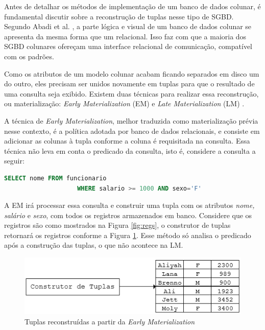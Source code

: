 Antes de detalhar os métodos de implementação de um banco de dados colunar, é fundamental discutir sobre a reconstrução de tuplas nesse tipo de SGBD. 
Segundo Abadi et al. \cite{abadi2007materialization}, a parte lógica e visual de um banco de dados colunar se apresenta da mesma forma que 
um relacional. Isso faz com que a maioria dos SGBD colunares ofereçam uma interface relacional de comunicação, compatível com os padrões.

Como os atributos de um modelo colunar acabam ficando separados em disco um do outro, eles precisam ser unidos novamente em tuplas para 
que o resultado de uma consulta seja exibido. Existem duas técnicas para realizar essa reconstrução, ou materialização: \textit{Early Materialization} (EM) e 
\textit{Late Materialization} (LM) \cite{abadi2007materialization, abadi2008query}.

A técnica de \textit{Early Materialization}, melhor traduzida como materialização prévia nesse contexto, é a política adotada por banco de dados relacionais, e consiste 
em adicionar as colunas à tupla conforme a coluna é requisitada na consulta. Essa técnica não leva em conta o predicado da consulta, isto é, considere 
a consulta a seguir:

\begin{lstlisting}[language=SQL,label=sql_1]
                    SELECT nome FROM funcionario 
                    WHERE salario >= 1000 AND sexo='F'
\end{lstlisting}

A EM irá processar essa consulta e construir uma tupla com os atributos \textit{nome, salário} e \textit{sexo}, com todos os registros 
armazenados em banco. Considere que os registros são como mostrados na Figura \ref{fig:regs}, o construtor de tuplas retornará os registros conforme a Figura \ref{fig:em}. Esse método só analisa o predicado após a construção das tuplas, o que não acontece na LM. 

\begin{figure}[htpb]
	\centering
        \includegraphics[width=14cm]{em}
	\caption{Tuplas reconstruídas a partir da \textit{Early Materialization}}
	\label{fig:em}
\end{figure}

